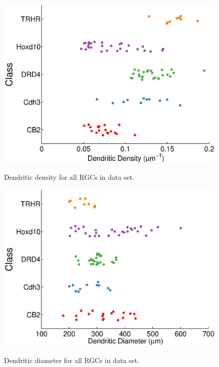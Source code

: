 \documentclass{article}
\begin{document}
\begin{figure}
  \centering
  {\includegraphics[scale=0.75]{Figures/SupFig3/plotFeatures-dendriticDensity.eps}}
  \caption{Dendritic density for all RGCs in data set.}
\end{figure}


\begin{figure}
  \centering
  {\includegraphics[scale=0.75]{Figures/SupFig3/plotFeatures-dendriticDiameter.eps}}
  \caption{Dendritic diameter for all RGCs in data set.}
\end{figure}

\clearpage
\end{document}
